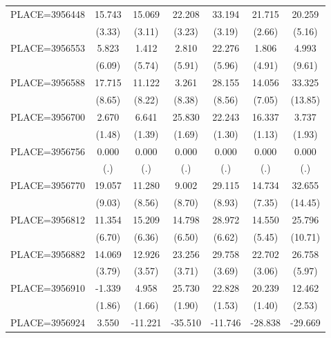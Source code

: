 {\begin{tabular}{l*{6}{c}}
PLACE=3956448       &      15.743&      15.069&      22.208&      33.194&      21.715&      20.259\\
                    &      (3.33)&      (3.11)&      (3.23)&      (3.19)&      (2.66)&      (5.16)\\
PLACE=3956553       &       5.823&       1.412&       2.810&      22.276&       1.806&       4.993\\
                    &      (6.09)&      (5.74)&      (5.91)&      (5.96)&      (4.91)&      (9.61)\\
PLACE=3956588       &      17.715&      11.122&       3.261&      28.155&      14.056&      33.325\\
                    &      (8.65)&      (8.22)&      (8.38)&      (8.56)&      (7.05)&     (13.85)\\
PLACE=3956700       &       2.670&       6.641&      25.830&      22.243&      16.337&       3.737\\
                    &      (1.48)&      (1.39)&      (1.69)&      (1.30)&      (1.13)&      (1.93)\\
PLACE=3956756       &       0.000&       0.000&       0.000&       0.000&       0.000&       0.000\\
                    &         (.)&         (.)&         (.)&         (.)&         (.)&         (.)\\
PLACE=3956770       &      19.057&      11.280&       9.002&      29.115&      14.734&      32.655\\
                    &      (9.03)&      (8.56)&      (8.70)&      (8.93)&      (7.35)&     (14.45)\\
PLACE=3956812       &      11.354&      15.209&      14.798&      28.972&      14.550&      25.796\\
                    &      (6.70)&      (6.36)&      (6.50)&      (6.62)&      (5.45)&     (10.71)\\
PLACE=3956882       &      14.069&      12.926&      23.256&      29.758&      22.702&      26.758\\
                    &      (3.79)&      (3.57)&      (3.71)&      (3.69)&      (3.06)&      (5.97)\\
PLACE=3956910       &      -1.339&       4.958&      25.730&      22.828&      20.239&      12.462\\
                    &      (1.86)&      (1.66)&      (1.90)&      (1.53)&      (1.40)&      (2.53)\\
PLACE=3956924       &       3.550&     -11.221&     -35.510&     -11.746&     -28.838&     -29.669\\

\end{tabular}}
